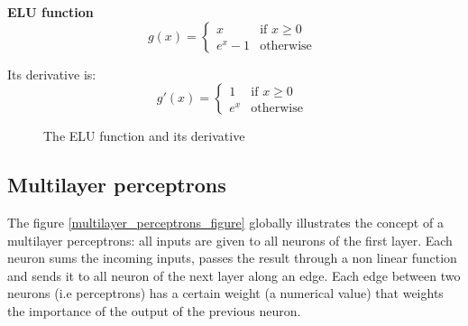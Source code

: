  
 
 
 \noindent \textbf{ELU function}\\
 \begin{equation}
 g(x) = 
 \begin{cases}
    x & \text{if } x\geq 0\\
    e^{x}-1 & \text{otherwise }
\end{cases}
 \end{equation}
  
 Its derivative is:
 \begin{equation}
g'(x) = 
 \begin{cases}
    1 & \text{if } x\geq 0\\
    e^{x} & \text{otherwise }
\end{cases}
 \end{equation}
 
 

  \begin{figure}[h!]
  \begin{center}
    \caption{The ELU function and its derivative}
  \end{center}
\end{figure} 

\subsection{Multilayer perceptrons}
\label{multilayer_perceptron}
The figure \ref{multilayer_perceptrons_figure} globally illustrates the concept of a multilayer perceptrons: all inputs are given to all neurons of the first layer. Each neuron sums the incoming inputs, passes the result through a non linear function and sends it to all neuron of the next layer along an edge. Each edge between two neurons (i.e perceptrons) has a certain weight (a numerical value) that weights the importance of the output of the previous neuron.\\

